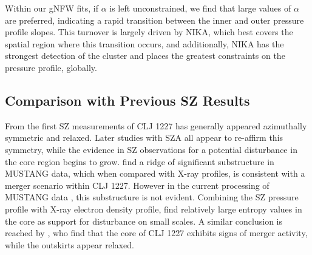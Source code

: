 \documentclass[twocolumn,traditabstract]{aa}
\begin{document}


Within our gNFW fits, if $\alpha$ is left unconstrained, we find that large values of $\alpha$ are preferred,
indicating a rapid transition between the inner and outer pressure profile slopes. This turnover is largely
driven by NIKA, which best covers the spatial region where this transition occurs, and additionally, NIKA
has the strongest detection of the cluster and places the greatest constraints on the pressure profile, globally.

\subsection{Comparison with Previous SZ Results}
\label{sec:prev_res}

From the first SZ measurements of CLJ 1227 \citep[made with BIMA][]{joy2001} has generally appeared
azimuthally symmetric and relaxed. Later studies with SZA \citep{muchovej2007,mroczkowski2009,mroczkowski2011}
all appear to re-affirm this symmetry, while the evidence in SZ observations for a potential disturbance
in the core region begins to grow. \citet{korngut2011} find a ridge of significant substructure in
MUSTANG data, which when compared with X-ray profiles, is consistent with a merger scenario within
CLJ 1227. However in the current processing of MUSTANG data \citep{romero2016},
this substructure is not evident. Combining the SZ pressure profile with X-ray electron density profile,
\citet{adam2015} find relatively large entropy values in the core as support for disturbance on small scales.
A similar conclusion is reached by \citet{rumsey2016}, who find that the core
of CLJ 1227 exhibits signs of merger activity, while the outskirts appear relaxed.
\end{document}
